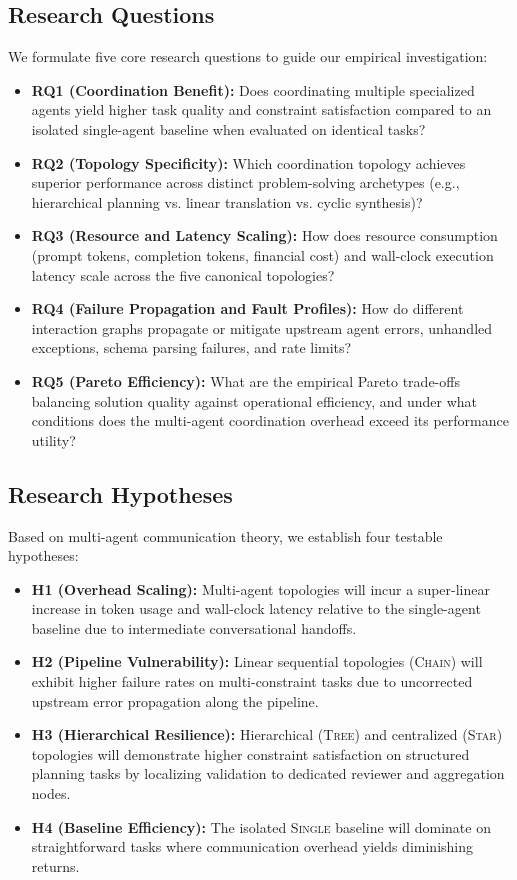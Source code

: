 \subsection{Research Questions}
We formulate five core research questions to guide our empirical investigation:
\begin{itemize}
    \item \textbf{RQ1 (Coordination Benefit):} Does coordinating multiple specialized agents yield higher task quality and constraint satisfaction compared to an isolated single-agent baseline when evaluated on identical tasks?
    \item \textbf{RQ2 (Topology Specificity):} Which coordination topology achieves superior performance across distinct problem-solving archetypes (e.g., hierarchical planning vs. linear translation vs. cyclic synthesis)?
    \item \textbf{RQ3 (Resource and Latency Scaling):} How does resource consumption (prompt tokens, completion tokens, financial cost) and wall-clock execution latency scale across the five canonical topologies?
    \item \textbf{RQ4 (Failure Propagation and Fault Profiles):} How do different interaction graphs propagate or mitigate upstream agent errors, unhandled exceptions, schema parsing failures, and rate limits?
    \item \textbf{RQ5 (Pareto Efficiency):} What are the empirical Pareto trade-offs balancing solution quality against operational efficiency, and under what conditions does the multi-agent coordination overhead exceed its performance utility?
\end{itemize}

\subsection{Research Hypotheses}
Based on multi-agent communication theory, we establish four testable hypotheses:
\begin{itemize}
    \item \textbf{H1 (Overhead Scaling):} Multi-agent topologies will incur a super-linear increase in token usage and wall-clock latency relative to the single-agent baseline due to intermediate conversational handoffs.
    \item \textbf{H2 (Pipeline Vulnerability):} Linear sequential topologies (\textsc{Chain}) will exhibit higher failure rates on multi-constraint tasks due to uncorrected upstream error propagation along the pipeline.
    \item \textbf{H3 (Hierarchical Resilience):} Hierarchical (\textsc{Tree}) and centralized (\textsc{Star}) topologies will demonstrate higher constraint satisfaction on structured planning tasks by localizing validation to dedicated reviewer and aggregation nodes.
    \item \textbf{H4 (Baseline Efficiency):} The isolated \textsc{Single} baseline will dominate on straightforward tasks where communication overhead yields diminishing returns.
\end{itemize}


